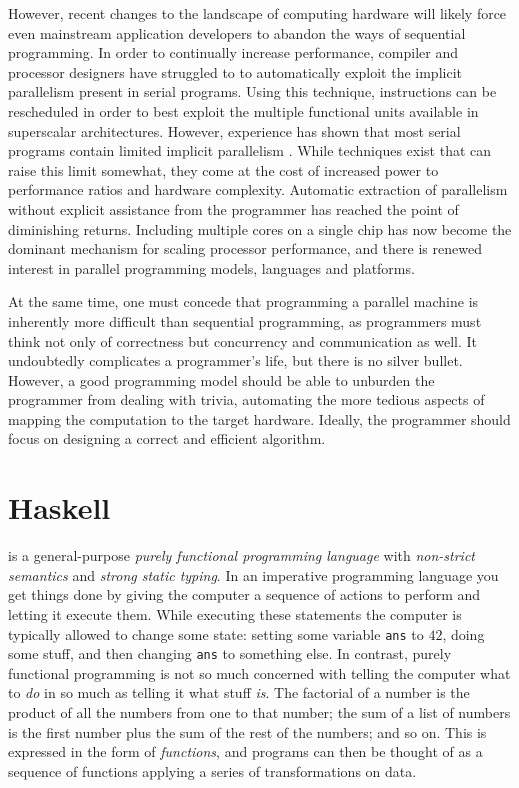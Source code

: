 However, recent changes to the landscape of computing hardware will likely force
even mainstream application developers to abandon the ways of sequential
programming. In order to continually increase performance, compiler and
processor designers have struggled to to automatically exploit the implicit
parallelism present in serial programs. Using this technique, instructions can
be rescheduled in order to best exploit the multiple functional units available
in superscalar architectures. However, experience has shown that most serial
programs contain limited implicit parallelism \cite{Wall:1991}. While
techniques exist that can raise this limit somewhat, they come at the cost of
increased power to performance ratios and hardware complexity. Automatic
extraction of parallelism without explicit assistance from the programmer has
reached the point of diminishing returns. Including multiple cores on a single
chip has now become the dominant mechanism for scaling processor performance,
and there is renewed interest in parallel programming models, languages and
platforms.

At the same time, one must concede that programming a parallel machine is
inherently more difficult than sequential programming, as programmers must think
not only of correctness but concurrency and communication as well. It
undoubtedly complicates a programmer's life, but there is no silver bullet.
However, a good programming model should be able to unburden the programmer from
dealing with trivia, automating the more tedious aspects of mapping the
computation to the target hardware. Ideally, the programmer should focus on
designing a correct and efficient algorithm.


\section{Haskell}
%
%

 is a general-purpose \emph{purely functional programming
language} with \emph{non-strict semantics} 
and \emph{strong static typing}. In an imperative programming
language you get things done by giving the computer a sequence of actions to
perform and letting it execute them. While executing these statements the
computer is typically allowed to change some state: setting some variable
\texttt{ans} to $42$, doing some stuff, and then changing \texttt{ans} to
something else. In contrast, purely functional programming is not so much
concerned with telling the computer what to \emph{do} in so much as telling it
what stuff \emph{is}. The factorial of a number is the product of all the
numbers from one to that number; the sum of a list of numbers is the first
number plus the sum of the rest of the numbers; and so on. This is expressed in
the form of \emph{functions}, and programs can then be thought of as a sequence
of functions applying a series of transformations on data.


